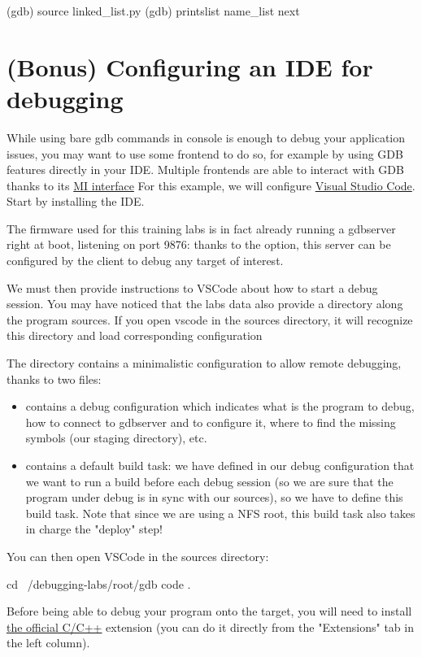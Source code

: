\begin{bashinput}
(gdb) source linked_list.py
(gdb) printslist name_list next
\end{bashinput}

\section{(Bonus) Configuring an IDE for debugging}

While using bare gdb commands in console is enough to debug your application issues, you
may want to use some frontend to do so, for example by using GDB features directly
in your IDE. Multiple frontends are able to interact with GDB thanks to its
\href{https://sourceware.org/gdb/current/onlinedocs/gdb.html/GDB_002fMI.html}{MI
interface}
For this example, we will configure
\href{https://code.visualstudio.com/}{Visual Studio Code}. Start by installing
the IDE.

The firmware used for this training labs is in fact already running a gdbserver
right at boot, listening on port 9876: thanks to the  option,
this server can be configured by the client to debug any target of interest.

We must then provide instructions to VSCode about how to start a debug session.
You may have noticed that the labs data also provide a  directory
along the program sources. If you open vscode in the sources directory, it will
recognize this  directory and load corresponding configuration

The  directory contains a minimalistic configuration to allow
remote debugging, thanks to two files:
\begin{itemize}
  \item {} contains a debug configuration which indicates what
  is the program to debug, how to connect to gdbserver and to configure it, where to
  find the missing symbols (our staging directory), etc.
  \item {} contains a default build task: we have defined in our
  debug configuration that we want to run a build before each debug session (so
  we are sure that the program under debug is in sync with our sources), so
  we have to define this build task. Note that since we are using a NFS root,
  this build task also takes in charge the "deploy" step!
\end{itemize}

You can then open VSCode in the sources directory:
\begin{bashinput}
  cd ~/debugging-labs/root/gdb
  code .
\end{bashinput}
Before being able to debug your program onto the target, you will need to install
\href{https://marketplace.visualstudio.com/items?itemName=ms-vscode.cpptools}{the
official C/C++} extension (you can do it directly from the "Extensions" tab in
the left column).

